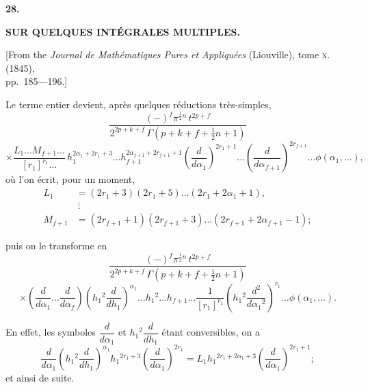 \documentclass[11pt,a4paper]{book}
\begin{document}
\newpage
{}
\setcounter{page}{197}

\begin{center}
{\large\bfseries 28.}
\end{center}
\vspace{0.5em}
\begin{center}
{\large\bfseries SUR QUELQUES INT\'{E}GRALES MULTIPLES.}
\end{center}
\vspace{0.5em}
\begin{center}
{[From the \textit{Journal de Math\'{e}matiques Pures et Appliqu\'{e}es} (Liouville), tome \textsc{x}. (1845),\\
pp.~185---196.]}
\end{center}
\vspace{1em}

Le terme entier devient, apr\`{e}s quelques r\'{e}ductions tr\`{e}s-simples,
\[
\frac{(-)^f \pi^{\frac{1}{2}n} \, t^{2p+f}}{2^{2p+k+f} \, \Gamma\left(p + k + f + \tfrac{1}{2}n + 1\right)}
\]
\[
\times \frac{L_1 \ldots M_{f+1} \ldots}{[r_1]^{r_1} \ldots} \, h_1^{2\alpha_1 + 2r_1 + 3} \ldots h_{f+1}^{2\alpha_{f+1} + 2r_{f+1} + 1} \left(\frac{d}{d\alpha_1}\right)^{2r_1+1} \ldots \left(\frac{d}{d\alpha_{f+1}}\right)^{2r_{f+1}} \ldots \phi(\alpha_1, \ldots),
\]
o\`{u} l'on \'{e}crit, pour un moment,
\begin{align*}
L_1 &= (2r_1 + 3)(2r_1 + 5) \ldots (2r_1 + 2\alpha_1 + 1),\\
&\ \vdots\\
M_{f+1} &= (2r_{f+1} + 1)(2r_{f+1} + 3) \ldots (2r_{f+1} + 2\alpha_{f+1} - 1);
\end{align*}

\newpage
\setcounter{page}{198}

puis on le transforme en
\[
\frac{(-)^f \pi^{\frac{1}{2}n} \, t^{2p+f}}{2^{2p+k+f} \, \Gamma\left(p + k + f + \tfrac{1}{2}n + 1\right)}
\]
\[
\times \left(\frac{d}{d\alpha_1} \ldots \frac{d}{d\alpha_f}\right) \left(h_1{}^{2} \frac{d}{dh_1}\right)^{\alpha_1} \ldots h_1{}^{2} \ldots h_{f+1} \ldots \frac{1}{[r_1]^{r_1}} \left(h_1{}^{2} \frac{d^{2}}{d\alpha_1{}^{2}}\right)^{r_1} \ldots \phi(\alpha_1, \ldots).
\]

En effet, les symboles $\dfrac{d}{d\alpha_1}$ et $h_1{}^{2}\dfrac{d}{dh_1}$ \'{e}tant conversibles, on a
\[
\frac{d}{d\alpha_1} \left(h_1{}^{2} \frac{d}{dh_1}\right)^{\alpha_1} h_1{}^{2r_1+3} \left(\frac{d}{d\alpha_1}\right)^{2r_1} = L_1 h_1{}^{2r_1+2\alpha_1+3} \left(\frac{d}{d\alpha_1}\right)^{2r_1+1};
\]
et ainsi de suite.
\end{document}
